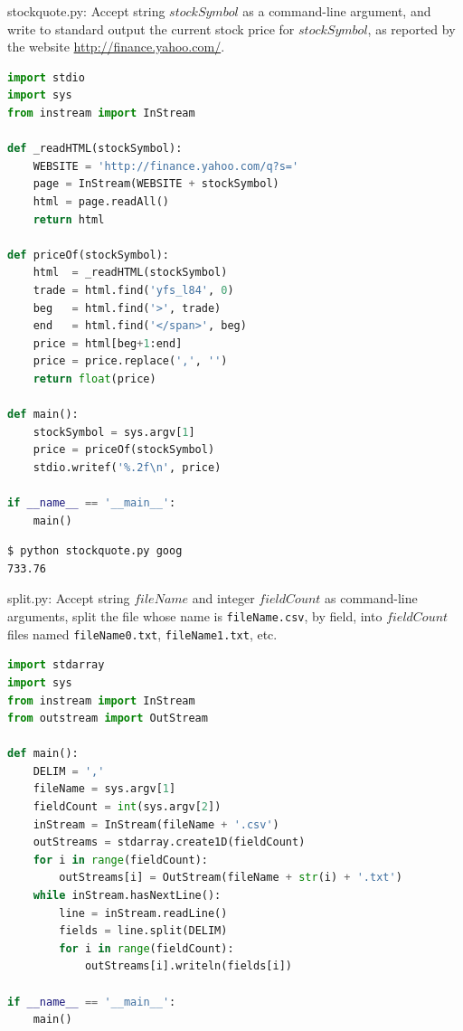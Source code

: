 \documentclass[8pt,a4paper,compress]{beamer}
\begin{document}
\begin{frame}[fragile]
\pause

\begin{framed}
\tiny stockquote.py: Accept string $stockSymbol$ as a command-line argument, and write to standard output the current stock price for $stockSymbol$, as reported by the website \href{http://finance.yahoo.com/}{http://finance.yahoo.com/}.
\end{framed}

\begin{lstlisting}[language=Python]
import stdio
import sys
from instream import InStream

def _readHTML(stockSymbol):
    WEBSITE = 'http://finance.yahoo.com/q?s='
    page = InStream(WEBSITE + stockSymbol)
    html = page.readAll()
    return html

def priceOf(stockSymbol):
    html  = _readHTML(stockSymbol)
    trade = html.find('yfs_l84', 0)
    beg   = html.find('>', trade)
    end   = html.find('</span>', beg)
    price = html[beg+1:end]
    price = price.replace(',', '')
    return float(price)

def main():
    stockSymbol = sys.argv[1]
    price = priceOf(stockSymbol)
    stdio.writef('%.2f\n', price)

if __name__ == '__main__':
    main()
\end{lstlisting}

\pause

\begin{lstlisting}[language={}]
$ python stockquote.py goog
733.76
\end{lstlisting}
\end{frame}

\begin{frame}[fragile]
\pause

\begin{framed}
\tiny split.py: Accept string $fileName$ and integer $fieldCount$ as command-line arguments, split the file whose name is \lstinline{fileName.csv}, by field, into $fieldCount$ files named \lstinline{fileName0.txt}, \lstinline{fileName1.txt}, etc.
\end{framed}

\begin{lstlisting}[language=Python]
import stdarray
import sys
from instream import InStream
from outstream import OutStream

def main():
    DELIM = ','
    fileName = sys.argv[1]
    fieldCount = int(sys.argv[2])
    inStream = InStream(fileName + '.csv')
    outStreams = stdarray.create1D(fieldCount)
    for i in range(fieldCount):
        outStreams[i] = OutStream(fileName + str(i) + '.txt')
    while inStream.hasNextLine():
        line = inStream.readLine()
        fields = line.split(DELIM)
        for i in range(fieldCount):
            outStreams[i].writeln(fields[i])

if __name__ == '__main__':
    main()
\end{lstlisting}
\end{frame}
\end{document}
